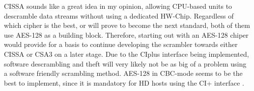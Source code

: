 CISSA sounds like a great idea in my opinion, allowing CPU-based units 
to descramble data streams without using a dedicated HW-Chip. Regardless
of which cipher is the best, or will prove to become the next standard, 
both of them use AES-128 as a building block. Therefore, starting out 
with an AES-128 chiper would provide for a basis to continue developing 
the scrambler towards either CISSA or CSA3 on a later stage. Due to the
CIplus interface being implemented, software descrambling and theft will
very likely not be as big of a problem using a software friendly 
scrambling method. AES-128 in CBC-mode seems to be the best to 
implement, since it is mandatory for HD hosts using the CI+ interface 
\citep[p. 15]{CI+:2011}.

